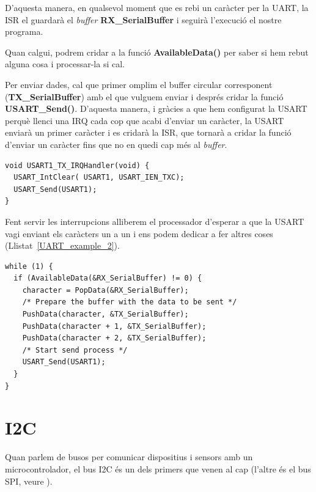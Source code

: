 D'aquesta manera, en qualsevol moment que es rebi un caràcter per la UART, la \gls{ISR} el guardarà el {\em buffer} {\bf RX\_SerialBuffer} i seguirà l'execució el nostre programa.

Quan calgui, podrem cridar a la funció {\bf AvailableData()} per saber si hem rebut alguna cosa i processar-la si cal.

Per enviar dades, cal que primer omplim el \gls{buffer circular} corresponent ({\bf TX\_SerialBuffer}) amb el que vulguem enviar i després cridar la funció {\bf USART\_Send()}. D'aquesta manera, i gràcies a que hem configurat la USART perquè llenci una \gls{IRQ} cada cop que acabi d'enviar un caràcter, la USART enviarà un primer caràcter i es cridarà la ISR, que tornarà a cridar la funció d'enviar un caràcter fins que no en quedi cap més al {\em buffer}.

\begin{lstlisting}[style=customc,label=ISR_UARTTX_Avançada,caption=Exemple ISR avançada]
void USART1_TX_IRQHandler(void) {
  USART_IntClear( USART1, USART_IEN_TXC);
  USART_Send(USART1);
}
\end{lstlisting}

Fent servir les interrupcions alliberem el processador d'esperar a que la USART vagi enviant els caràcters un a un i ens podem dedicar a fer altres coses (Llistat~\ref{UART_example_2}).

\begin{lstlisting}[style=customc,label=UART_example_2,caption=Funció main]
while (1) {
  if (AvailableData(&RX_SerialBuffer) != 0) {
    character = PopData(&RX_SerialBuffer);
    /* Prepare the buffer with the data to be sent */
    PushData(character, &TX_SerialBuffer);
    PushData(character + 1, &TX_SerialBuffer);
    PushData(character + 2, &TX_SerialBuffer);
    /* Start send process */
    USART_Send(USART1);
  }
}
\end{lstlisting}


\chapter{I2C}
\label{sub:I2C}
Quan parlem de busos per comunicar dispositius i sensors amb un microcontrolador, el bus \gls{I2C} és un dels primers que venen al cap (l'altre és el bus \gls{SPI}, veure ).

